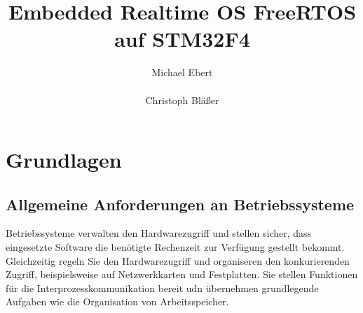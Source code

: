 \documentclass[ngerman]{seminarvorlage}
\begin{document}
\title{Embedded Realtime OS FreeRTOS auf STM32F4}
\author{
  \alignauthor Michael Ebert\\
		\\
  \alignauthor Christoph Bläßer\\
}

\maketitle
{}

\section{Grundlagen}
\subsection{Allgemeine Anforderungen an Betriebssysteme}
Betriebssysteme verwalten den Hardwarezugriff und stellen sicher, dass eingesetzte Software die benötigte Rechenzeit zur Verfügung gestellt bekommt. Gleichzeitig regeln Sie den Hardwarezugriff und organiseren den konkurierenden Zugriff, beispielsweise auf Netzwerkkarten und Festplatten. Sie stellen Funktionen für die Interprozesskommunikation bereit udn übernehmen grundlegende Aufgaben wie die Organisation von Arbeitsspeicher.

\end{document}
